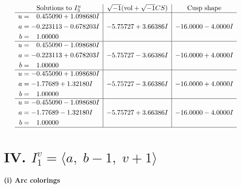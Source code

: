 \documentclass[1p]{elsarticle_modified}
\theoremstyle{definition}
\newcommand{\I}{\sqrt{-1}}
\begin{document}
$$\begin{array}{c|c|c}  
\text{Solutions to }I^u_{3}& \I (\text{vol} + \sqrt{-1}CS) & \text{Cusp shape}\\
 \hline 
\begin{aligned}
u &= \phantom{-}0.455090 + 1.098680 I \\
a &= -0.223113 - 0.678203 I \\
b &= \phantom{-}1.00000\phantom{ +0.000000I}\end{aligned}
 & -5.75727 + 3.66386 I & -16.0000 - 4.0000 I \\ \hline\begin{aligned}
u &= \phantom{-}0.455090 - 1.098680 I \\
a &= -0.223113 + 0.678203 I \\
b &= \phantom{-}1.00000\phantom{ +0.000000I}\end{aligned}
 & -5.75727 - 3.66386 I & -16.0000 + 4.0000 I \\ \hline\begin{aligned}
u &= -0.455090 + 1.098680 I \\
a &= -1.77689 + 1.32180 I \\
b &= \phantom{-}1.00000\phantom{ +0.000000I}\end{aligned}
 & -5.75727 - 3.66386 I & -16.0000 + 4.0000 I \\ \hline\begin{aligned}
u &= -0.455090 - 1.098680 I \\
a &= -1.77689 - 1.32180 I \\
b &= \phantom{-}1.00000\phantom{ +0.000000I}\end{aligned}
 & -5.75727 + 3.66386 I & -16.0000 - 4.0000 I\\
 \hline 
 \end{array}$$\newpage\newpage\renewcommand{\arraystretch}{1}
\centering \section*{IV. $I^v_{1}= \langle a,\;b-1,\;v+1 \rangle$}
\flushleft \textbf{(i) Arc colorings}\\
\end{document}
